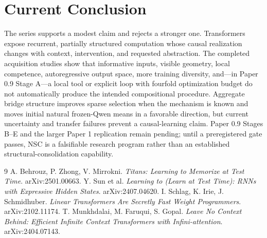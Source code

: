 \documentclass[11pt]{article}
\begin{document}
\section{Current Conclusion}
The series supports a modest claim and rejects a stronger one. Transformers expose recurrent, partially structured computation whose causal realization changes with context, intervention, and requested abstraction. The completed acquisition studies show that informative inputs, visible geometry, local competence, autoregressive output space, more training diversity, and---in Paper 0.9 Stage A---a local tool or explicit loop with fourfold optimization budget do not automatically produce the intended compositional procedure. Aggregate bridge structure improves sparse selection when the mechanism is known and moves initial natural frozen-Qwen means in a favorable direction, but current uncertainty and transfer failures prevent a causal-learning claim. Paper 0.9 Stages B--E and the larger Paper 1 replication remain pending; until a preregistered gate passes, NSC is a falsifiable research program rather than an established structural-consolidation capability.

\begin{thebibliography}{9}
 A. Behrouz, P. Zhong, V. Mirrokni. \emph{Titans: Learning to Memorize at Test Time}. arXiv:2501.00663.
 Y. Sun et al. \emph{Learning to (Learn at Test Time): RNNs with Expressive Hidden States}. arXiv:2407.04620.
 I. Schlag, K. Irie, J. Schmidhuber. \emph{Linear Transformers Are Secretly Fast Weight Programmers}. arXiv:2102.11174.
 T. Munkhdalai, M. Faruqui, S. Gopal. \emph{Leave No Context Behind: Efficient Infinite Context Transformers with Infini-attention}. arXiv:2404.07143.
\end{thebibliography}
\end{document}
